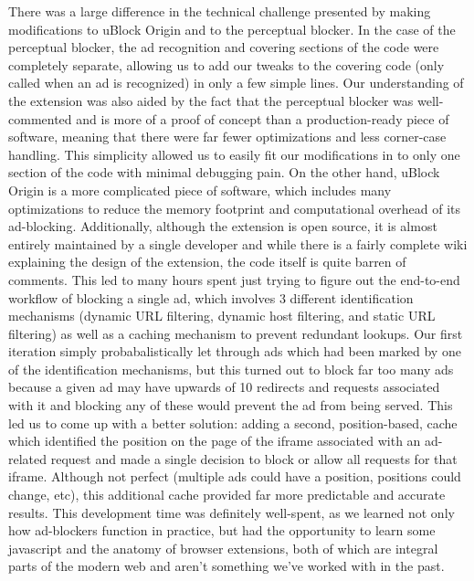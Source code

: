 There was a large difference in the technical challenge presented by making modifications to uBlock Origin and to the perceptual blocker.
In the case of the perceptual blocker, the ad recognition and covering sections of the code were completely separate, allowing us to add our tweaks to the covering code (only called when an ad is recognized) in only a few simple lines.
Our understanding of the extension was also aided by the fact that the perceptual blocker was well-commented and is more of a proof of concept than a production-ready piece of software, meaning that there were far fewer optimizations and less corner-case handling.
This simplicity allowed us to easily fit our modifications in to only one section of the code with minimal debugging pain.
On the other hand, uBlock Origin is a more complicated piece of software, which includes many optimizations to reduce the memory footprint and computational overhead of its ad-blocking.
Additionally, although the extension is open source, it is almost entirely maintained by a single developer and while there is a fairly complete wiki explaining the design of the extension, the code itself is quite barren of comments.
This led to many hours spent just trying to figure out the end-to-end workflow of blocking a single ad, which involves 3 different identification mechanisms (dynamic URL filtering, dynamic host filtering, and static URL filtering) as well as a caching mechanism to prevent redundant lookups.
Our first iteration simply probabalistically let through ads which had been marked by one of the identification mechanisms, but this turned out to block far too many ads because a given ad may have upwards of 10 redirects and requests associated with it and blocking any of these would prevent the ad from being served.
This led us to come up with a better solution: adding a second, position-based, cache which identified the position on the page of the iframe associated with an ad-related request and made a single decision to block or allow all requests for that iframe.
Although not perfect (multiple ads could have a position, positions could change, etc), this additional cache provided far more predictable and accurate results.
This development time was definitely well-spent, as we learned not only how ad-blockers function in practice, but had the opportunity to learn some javascript and the anatomy of browser extensions, both of which are integral parts of the modern web and aren't something we've worked with in the past.

